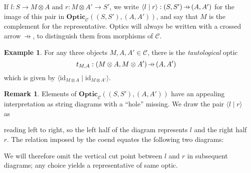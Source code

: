 \documentclass[11pt,a4paper]{article}
\theoremstyle{plain}
\theoremstyle{definition}
\newtheorem{example}[theorem]{Example}
\newtheorem{remark}[theorem]{Remark}
\newcommand{\C}{\mathscr{C}}
\newcommand{\Optic}{\mathbf{Optic}}
\newcommand{\id}{\mathrm{id}}
\newcommand{\hto}{\ensuremath{\,\mathaccent\shortmid\rightarrow\,}}
\begin{document}
If $l : S \to M \otimes A$ and $r : M \otimes A' \to S'$, we write $\langle l \mid r \rangle : (S, S') \hto (A, A')$ for the image of this pair in $\Optic_\C((S, S'), (A, A'))$, and say that $M$ is the complement for the representative. Optics will always be written with a crossed arrow $\hto$, to distinguish them from morphisms of $\C$.

\begin{example}
  For any three objects $M, A, A' \in \C$, there is the \emph{tautological} optic \[t_{M,A} : (M \otimes A, M \otimes A') \hto (A, A')\] which is given by $\langle \id_{M \otimes A}\mid \id_{M \otimes A'} \rangle$.
\end{example}

\begin{remark}
  Elements of $\Optic_\C((S, S'), (A, A'))$ have an appealing
  interpretation as string diagrams with a ``hole'' missing. We draw the
  pair $\langle l \mid r \rangle$ as
  \begin{center}
    
  \end{center}
  reading left to right, so the left half of the diagram represents $l$ and the right half $r$. The relation imposed by the coend equates the following two diagrams:
  \begin{center}
    
    \qquad
    
  \end{center}
  We will therefore omit the vertical cut point between $l$ and $r$ in subsequent diagrams; any choice yields a representative of same optic.
\end{remark}
\end{document}
